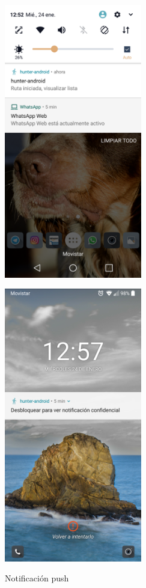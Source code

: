 	\begin{figure}[htbp]
\begin{minipage}[b]{0.5\linewidth} %
\centering
\includegraphics[width=6cm]{capturamovil/push1.png}
 \label{figura1}

\end{minipage}
\hspace{0.5cm} %
\begin{minipage}[b]{0.5\linewidth}
\centering
\includegraphics[width=6cm]{capturamovil/push2.png}
 \label{figura2}

\end{minipage}
\caption{Notificación push }
\end{figure} 
 
